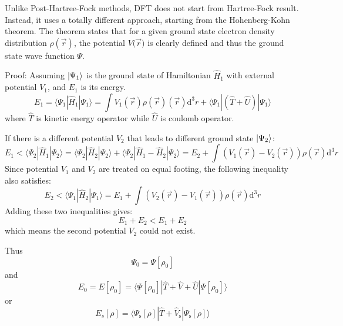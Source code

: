 Unlike Post-Hartree-Fock methods, DFT does not start from Hartree-Fock result.
Instead, it uses a totally different approach, starting from the Hohenberg-Kohn theorem. \cite{hktheorem}
The theorem states that for a given ground state electron density distribution $\rho ({\vec{r}})$, the potential $V ({\vec{r})}$ is clearly defined and thus the ground state wave function $\Psi$.

Proof:
Assuming $\ket{\Psi_1}$ is the ground state of Hamiltonian $\hat{H}_1$ with external potential $V_1$, and $E_1$ is its energy.
\begin{equation}
E_{1}=\langle\Psi_{1}|\hat{H}_{1}| \Psi_{1}\rangle=\int V_{1}(\vec{r}) \rho(\vec{r})(\vec{r}) \mathrm{d}^{3} r+\langle\Psi_{1}|(\hat{T}+\hat{U})| \Psi_{1}\rangle
\end{equation}
where $\hat{T}$ is kinetic energy operator while $\hat{U}$ is coulomb operator.

If there is a different potential $V_2$ that leads to different ground state $\ket{\Psi_2}$:
\begin{equation}
E_{1}<\langle\Psi_{2}|\hat{H}_{1}| \Psi_{2}\rangle=\langle\Psi_{2}|\hat{H}_{2}| \Psi_{2}\rangle+\langle\Psi_{2}|\hat{H}_{1}-\hat{H}_{2}| \Psi_{2}\rangle= E_{2}+\int\left(V_{1}(\vec{r})-V_{2}(\vec{r})\right) \rho(\vec{r}) \mathrm{d}^{3} r
\end{equation}
Since potential $V_1$ and $V_2$ are treated on equal footing, the following inequality also satisfies:
\begin{equation}
E_{2}<\langle\Psi_{1}|\hat{H}_{2}| \Psi_{1}\rangle= E_{1}+\int\left(V_{2}(\vec{r})-V_{1}(\vec{r})\right) \rho(\vec{r}) \mathrm{d}^{3} r
\end{equation}
Adding these two inequalities gives:
\begin{equation}
E_{1}+E_{2}<E_{1}+E_{2}
\end{equation}
which means the second potential $V_2$ could not exist.

Thus
\begin{equation}
\Psi_{0}=\Psi[\rho_{0}]
\end{equation}
and
\begin{equation}
E_{0}=E[\rho_{0}]=\langle\Psi[\rho_{0}]|\hat{T}+\hat{V}+\hat{U}| \Psi[\rho_{0}]\rangle
\end{equation}
or
\begin{equation}
E_{s}[\rho]=\langle\Psi_{\mathrm{s}}[\rho]|\hat{T}+\hat{V}_{\mathrm{s}}| \Psi_{\mathrm{s}}[\rho]\rangle
\end{equation}

